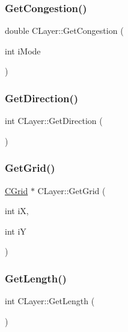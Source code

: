 \subsubsection{\texorpdfstring{GetCongestion()}{GetCongestion()}}
{\footnotesize\ttfamily double C\+Layer\+::\+Get\+Congestion (\begin{DoxyParamCaption}\item[{int}]{i\+Mode }\end{DoxyParamCaption})}

\mbox{\label{classCLayer_a50d4ff62846c5c7f438a0b9e1b3b54e7}} 
\subsubsection{\texorpdfstring{GetDirection()}{GetDirection()}}
{\footnotesize\ttfamily int C\+Layer\+::\+Get\+Direction (\begin{DoxyParamCaption}{ }\end{DoxyParamCaption})}

\mbox{\label{classCLayer_a1c81a1fe85a0ad9fa4a7cc6a86fec146}} 
\subsubsection{\texorpdfstring{GetGrid()}{GetGrid()}}
{\footnotesize\ttfamily \mbox{\hyperlink{classCGrid}{C\+Grid}} $\ast$ C\+Layer\+::\+Get\+Grid (\begin{DoxyParamCaption}\item[{int}]{iX,  }\item[{int}]{iY }\end{DoxyParamCaption})}

\mbox{\label{classCLayer_a4e139423a04a8dd850ded7e9185c0a89}} 
\subsubsection{\texorpdfstring{GetLength()}{GetLength()}}
{\footnotesize\ttfamily int C\+Layer\+::\+Get\+Length (\begin{DoxyParamCaption}{ }\end{DoxyParamCaption})}


